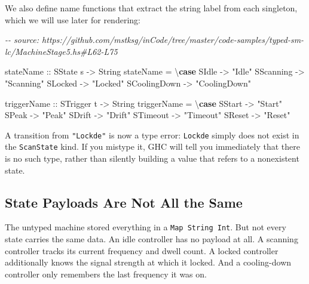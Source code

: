 \documentclass[]{article}
\newenvironment{Shaded}{}{}
\newcommand{\CommentTok}[1]{\textcolor[rgb]{0.38,0.63,0.69}{\textit{#1}}}
\newcommand{\DataTypeTok}[1]{\textcolor[rgb]{0.56,0.13,0.00}{#1}}
\newcommand{\KeywordTok}[1]{\textcolor[rgb]{0.00,0.44,0.13}{\textbf{#1}}}
\newcommand{\NormalTok}[1]{#1}
\newcommand{\OtherTok}[1]{\textcolor[rgb]{0.00,0.44,0.13}{#1}}
\newcommand{\StringTok}[1]{\textcolor[rgb]{0.25,0.44,0.63}{#1}}
\begin{document}
We also define name functions that extract the string label from each singleton,
which we will use later for rendering:

\begin{Shaded}
\begin{Highlighting}[]
\CommentTok{{-}{-} source: https://github.com/mstksg/inCode/tree/master/code{-}samples/typed{-}sm{-}lc/MachineStage5.hs\#L62{-}L75}

\OtherTok{stateName ::} \DataTypeTok{SState}\NormalTok{ s }\OtherTok{{-}\textgreater{}} \DataTypeTok{String}
\NormalTok{stateName }\OtherTok{=}\NormalTok{ \textbackslash{}}\KeywordTok{case}
  \DataTypeTok{SIdle} \OtherTok{{-}\textgreater{}} \StringTok{"Idle"}
  \DataTypeTok{SScanning} \OtherTok{{-}\textgreater{}} \StringTok{"Scanning"}
  \DataTypeTok{SLocked} \OtherTok{{-}\textgreater{}} \StringTok{"Locked"}
  \DataTypeTok{SCoolingDown} \OtherTok{{-}\textgreater{}} \StringTok{"CoolingDown"}

\OtherTok{triggerName ::} \DataTypeTok{STrigger}\NormalTok{ t }\OtherTok{{-}\textgreater{}} \DataTypeTok{String}
\NormalTok{triggerName }\OtherTok{=}\NormalTok{ \textbackslash{}}\KeywordTok{case}
  \DataTypeTok{SStart} \OtherTok{{-}\textgreater{}} \StringTok{"Start"}
  \DataTypeTok{SPeak} \OtherTok{{-}\textgreater{}} \StringTok{"Peak"}
  \DataTypeTok{SDrift} \OtherTok{{-}\textgreater{}} \StringTok{"Drift"}
  \DataTypeTok{STimeout} \OtherTok{{-}\textgreater{}} \StringTok{"Timeout"}
  \DataTypeTok{SReset} \OtherTok{{-}\textgreater{}} \StringTok{"Reset"}
\end{Highlighting}
\end{Shaded}

A transition from \texttt{"Lockde"} is now a type error: \texttt{Lockde} simply
does not exist in the \texttt{ScanState} kind. If you mistype it, GHC will tell
you immediately that there is no such type, rather than silently building a
value that refers to a nonexistent state.

\subsection{State Payloads Are Not All the
Same}\label{state-payloads-are-not-all-the-same}

The untyped machine stored everything in a \texttt{Map\ String\ Int}. But not
every state carries the same data. An idle controller has no payload at all. A
scanning controller tracks its current frequency and dwell count. A locked
controller additionally knows the signal strength at which it locked. And a
cooling-down controller only remembers the last frequency it was on.
\end{document}
